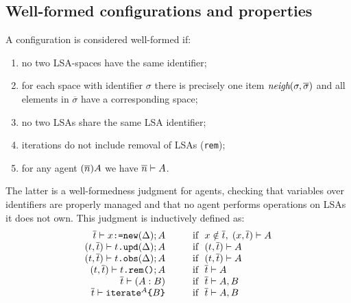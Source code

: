 \documentclass[12pt,a4paper,twoside,openright]{book}
\begin{document}
\subsection{Well-formed configurations and properties}

A configuration is considered well-formed if:
\begin{enumerate}
 \item no two LSA-spaces have the same identifier;
 \item for each space with identifier $\sigma$ there is precisely one item $\textit{neigh}(\sigma,\overline{\sigma})$ and all elements in $\overline{\sigma}$ have a corresponding space;
 \item no two LSAs share the same LSA identifier;
 \item iterations do not include removal of LSAs (\texttt{rem});
 \item for any agent $(\overline{n})A$ we have $\overline{n}\vdash A$.
\end{enumerate}
%
The latter is a well-formedness judgment for agents, checking that variables over identifiers are properly managed and that no agent performs operations on LSAs it does not own. This judgment is inductively defined as:
%
\[\begin{array}{r@{\hspace{1cm}}l}
%
\ccheck{\cList{\sTr}}{\cNew{\sVr}{\sDE}\oSeq\sAg} & \textrm{if~~} x\notin\cList{\sTr} \myquad \ccheck{(\sVr,\cList{\sTr})}{\sAg}\\
\ccheck{(\sTr,\cList{\sTr})}{\cUpd{\sTr}{\sDE}\oSeq\sAg} & \textrm{if~~} \ccheck{(\sTr,\cList{\sTr})}{\sAg}\\
\ccheck{(\sTr,\cList{\sTr})}{\cObs{\sTr}{\sDE}\oSeq\sAg} & \textrm{if~~} \ccheck{(\sTr,\cList{\sTr})}{\sAg}\\
\ccheck{(\sTr,\cList{\sTr})}{\cRem{\sTr}\oSeq\sAg} & \textrm{if~~} \ccheck{\cList{\sTr}}{\sAg}\\
\ccheck{\cList{\sTr}}{(\sAg\oOr\sAgB)} & \textrm{if~~} \ccheck{\cList{\sTr}}{\sAg,\sAgB}\\
\ccheck{\cList{\sTr}}{\cRecR{\sAgB}{\sAg}} & \textrm{if~~} \ccheck{\cList{\sTr}}{\sAg,\sAgB}\\
%
\end{array}\]
%
\end{document}
